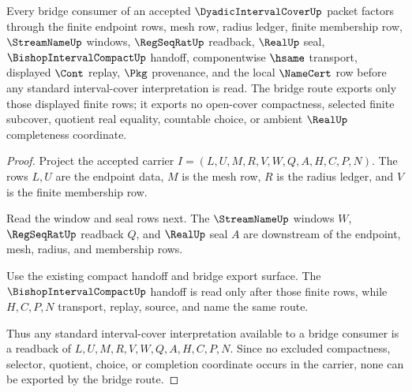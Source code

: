 \begin{theorem}
\label{thm:dyadic-interval-cover-bridge-finite-route}
Every bridge consumer of an accepted $\DyadicIntervalCoverUp$ packet factors through the finite endpoint rows, mesh row, radius ledger, finite membership row, $\StreamNameUp$ windows, $\RegSeqRatUp$ readback, $\RealUp$ seal, $\BishopIntervalCompactUp$ handoff, componentwise $\hsame$ transport, displayed $\Cont$ replay, $\Pkg$ provenance, and the local $\NameCert$ row before any standard interval-cover interpretation is read. The bridge route exports only those displayed finite rows; it exports no open-cover compactness, selected finite subcover, quotient real equality, countable choice, or ambient $\RealUp$ completeness coordinate.
\end{theorem}
\begin{proof}
Project the accepted carrier $I=(L,U,M,R,V,W,Q,A,H,C,P,N)$. The rows $L,U$ are the endpoint data, $M$ is the mesh row, $R$ is the radius ledger, and $V$ is the finite membership row.

Read the window and seal rows next. The $\StreamNameUp$ windows $W$, $\RegSeqRatUp$ readback $Q$, and $\RealUp$ seal $A$ are downstream of the endpoint, mesh, radius, and membership rows.

Use the existing compact handoff and bridge export surface. The $\BishopIntervalCompactUp$ handoff is read only after those finite rows, while $H,C,P,N$ transport, replay, source, and name the same route.

Thus any standard interval-cover interpretation available to a bridge consumer is a readback of $L,U,M,R,V,W,Q,A,H,C,P,N$. Since no excluded compactness, selector, quotient, choice, or completion coordinate occurs in the carrier, none can be exported by the bridge route.
\end{proof}


